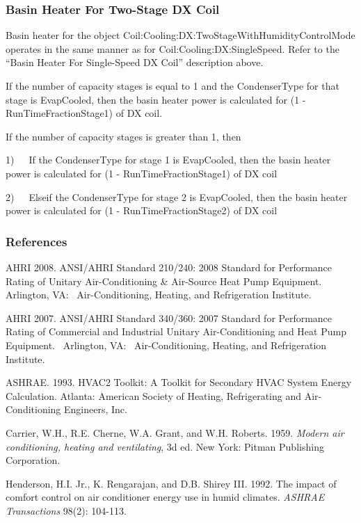 \subsubsection{Basin Heater For Two-Stage DX Coil}\label{basin-heater-for-two-stage-dx-coil}

Basin heater for the object Coil:Cooling:DX:TwoStageWithHumidityControlMode operates in the same manner as for Coil:Cooling:DX:SingleSpeed. Refer to the ``Basin Heater For Single-Speed DX Coil'' description above.

If the number of capacity stages is equal to 1 and the CondenserType for that stage is EvapCooled, then the basin heater power is calculated for (1 - RunTimeFractionStage1) of DX coil.

If the number of capacity stages is greater than 1, then

1)~~~If the CondenserType for stage 1 is EvapCooled, then the basin heater power is calculated for (1 - RunTimeFractionStage1) of DX coil

2)~~~Elseif the CondenserType for stage 2 is EvapCooled, then the basin heater power is calculated for (1 - RunTimeFractionStage2) of DX coil

\subsubsection{References}\label{references-2-002}

AHRI 2008. ANSI/AHRI Standard 210/240: 2008 Standard for Performance Rating of Unitary Air-Conditioning \& Air-Source Heat Pump Equipment.~ Arlington, VA:~ Air-Conditioning, Heating, and Refrigeration Institute.

AHRI 2007. ANSI/AHRI Standard 340/360: 2007 Standard for Performance Rating of Commercial and Industrial Unitary Air-Conditioning and Heat Pump Equipment.~ Arlington, VA:~ Air-Conditioning, Heating, and Refrigeration Institute.

ASHRAE. 1993. HVAC2 Toolkit: A Toolkit for Secondary HVAC System Energy Calculation. Atlanta: American Society of Heating, Refrigerating and Air-Conditioning Engineers, Inc.

Carrier, W.H., R.E. Cherne, W.A. Grant, and W.H. Roberts. 1959. \emph{Modern air conditioning, heating and ventilating}, 3d ed. New York: Pitman Publishing Corporation.

Henderson, H.I. Jr., K. Rengarajan, and D.B. Shirey III. 1992. The impact of comfort control on air conditioner energy use in humid climates. \emph{ASHRAE Transactions} 98(2): 104-113.

